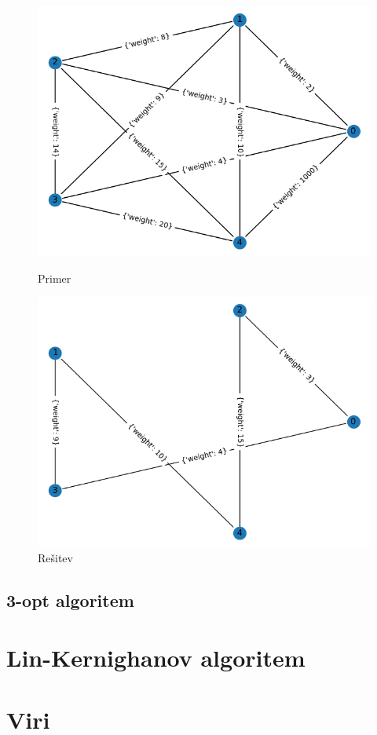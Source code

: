 \documentclass[12pt, a4paper]{article}
\begin{document}
\begin{figure}[!h]
    
    \begin{minipage}{0.5\textwidth}
    \includegraphics[width=8 cm]{primer.png}
    \caption{Primer}
    \label{primer_2_opt}
  \end{minipage}
 \hspace{1cm}
  \begin{minipage}{0.5\textwidth}
    \includegraphics[width=8 cm]{resitev_primer.png}
    \caption{Rešitev}
    \label{resitev_2_opt}
  \end{minipage}
    
\end{figure}

\subsection[3-opt algoritem]{3-opt algoritem}

\newpage
\section[Lin-Kernighanov algoritem]{Lin-Kernighanov algoritem}

\newpage
\section[Viri]{Viri}
\end{document}
